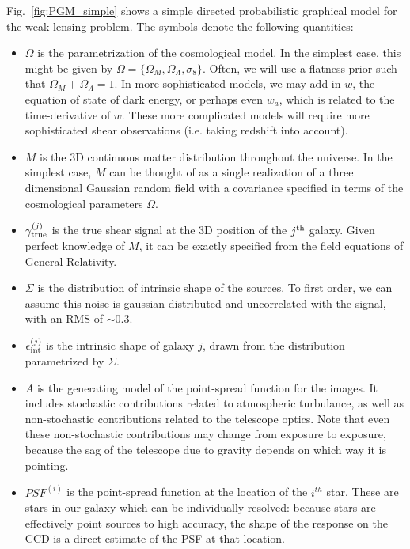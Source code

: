 \documentclass[12pt]{article}
\newcommand{\fig}[1]{Fig.~\ref{fig:#1}}
\begin{document}
\fig{PGM_simple} shows a simple directed probabilistic graphical model for
the weak lensing problem.  The symbols denote the following quantities:
\begin{itemize}
  \item $\Omega$ is the parametrization of the cosmological model.  In the
    simplest case, this might be given by
    $\Omega = \{\Omega_M, \Omega_\Lambda, \sigma_8\}$.  Often, we will
    use a flatness prior such that $\Omega_M + \Omega_\Lambda = 1$.  In
    more sophisticated models, we may add in $w$, the equation of state
    of dark energy, or perhaps even $w_a$, which is related to the
    time-derivative of $w$.  These more complicated models will require
    more sophisticated shear observations (i.e. taking redshift into account).

  \item $M$ is the 3D continuous matter distribution throughout the universe.
    In the simplest case, $M$ can be thought of as a single realization of
    a three dimensional Gaussian random field with a covariance specified
    in terms of the cosmological parameters $\Omega$.

  \item $\gamma_{\rm true}^{(j)}$ is the true shear signal at the 3D position
    of the $j^{\rm th}$ galaxy.  Given perfect knowledge of $M$, it can
    be exactly specified from the field equations of General Relativity.

  \item $\Sigma$ is the distribution of intrinsic shape of the sources.  To
    first order, we can assume this noise is gaussian distributed and
    uncorrelated with the signal, with an RMS of $\sim 0.3$.

  \item $\epsilon_{\rm int}^{(j)}$ is the intrinsic shape of galaxy $j$, drawn
    from the distribution parametrized by $\Sigma$.

  \item $A$ is the generating model of the point-spread function for the
    images.  It includes stochastic contributions related to atmospheric
    turbulance, as well as non-stochastic contributions related to the
    telescope optics.  Note that even these non-stochastic contributions
    may change from exposure to exposure, because the sag of the telescope
    due to gravity depends on which way it is pointing.

  \item $PSF^{(i)}$ is the point-spread function at the location of the
    $i^{th}$ star.  These are stars in our galaxy which can be individually
    resolved: because stars are effectively point sources to high accuracy,
    the shape of the response on the CCD is a direct estimate of the PSF
    at that location.


\end{itemize}
\end{document}
